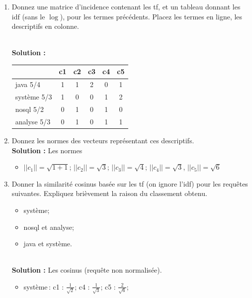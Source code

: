 \documentclass[11pt,a4paper]{article}
\newenvironment{solution}[0]{
~\\ \color{red} \textbf{Solution : }\color{black}}{%
}
\begin{document}
\begin{enumerate}
   \item Donnez une matrice d'incidence contenant les tf, 
      et un tableau donnant les idf (sans le $\log$), pour les  termes précédents. Placez
      les termes en ligne, les descriptifs en colonne.

\begin{solution}
\begin{center}
\begin{tabular}{l|c|c|c|c|c}
            & \textbf{c1} & \textbf{c2} & \textbf{c3} &\textbf{c4}&\textbf{c5} \\ \hline  
   java  5/4   & 1           & 1           & 2           & 0         & 1\\
   système 5/3  & 1           & 0           & 0           & 1         & 2\\
   nosql 5/2  & 0           & 1           & 0           & 1         & 0\\
   analyse 5/3  & 0           & 1           & 0           & 1         & 1\\\hline
   \end{tabular}
\end{center}
\end{solution}

  \item Donnez les normes des vecteurs représentant ces descriptifs.
\begin{solution}
Les normes
\begin{itemize}
  \item $||c_1|| = \sqrt{1+ 1}$; $||c_2|| = \sqrt{3}$; $||c_3|| = \sqrt{4}$; 
    $||c_4|| = \sqrt{3}$, $||c_5|| = \sqrt{6}$  
\end{itemize}
\end{solution}
  
  \item Donner la similarité cosinus basée sur les tf 
  (on ignore l'idf) pour les requêtes suivantes. Expliquez brièvement la raison
  du classement obtenu.
  
  \begin{itemize}
    \item système;
    \item nosql et analyse;
    \item java et système.
  \end{itemize}
\begin{solution}
Les cosinus (requête non normalisée).

\begin{itemize}
  \item système\,: c1 : $\frac{1}{\sqrt{2}}$;  
       c4 : $\frac{1}{\sqrt{3}}$; 
       c5 : $\frac{2}{\sqrt{6}}$; 
  

\end{itemize}
\end{solution}
\end{enumerate}
\end{document}
